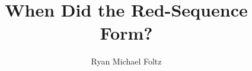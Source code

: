 \documentclass[oneside,final,letterpaper,10pt]{ucr}
\def\dsp{\def\baselinestretch{2.0}\large\normalsize} \dsp
\begin{document}
\title{When Did the Red-Sequence Form?}
\author{Ryan Michael Foltz}

\maketitle
\copyrightpage{}
\approvalpage{}


\begin{frontmatter}







\tableofcontents
\newpage
\listoffigures
\newpage
\listoftables
\end{frontmatter}









\newpage


\newcommand\newblock{\hskip .11em\@plus.33em\@minus.07em}

\def\dsp{\def\baselinestretch{1.0}\large\normalsize} \dsp


\end{document}
